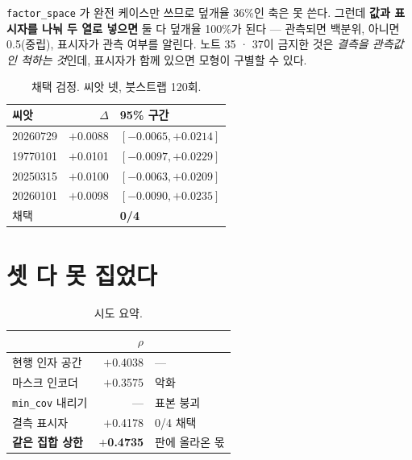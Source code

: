 \documentclass[10pt]{article}
\begin{document}
\texttt{factor\_space} 가 완전 케이스만 쓰므로 덮개율 36\%인 축은 못 쓴다.
그런데 \textbf{값과 표시자를 나눠 두 열로 넣으면} 둘 다 덮개율 100\%가 된다 ---
관측되면 백분위, 아니면 0.5(중립), 표시자가 관측 여부를 알린다. 노트 35 · 37이
금지한 것은 \emph{결측을 관측값인 척하는 것}인데, 표시자가 함께 있으면 모형이
구별할 수 있다.

\begin{table}[t]
\centering\tsize
\caption{채택 검정. 씨앗 넷, 붓스트랩 120회.}
\begin{tabular}{lrl}
\toprule
씨앗 & $\Delta$ & 95\% 구간 \\
\midrule
20260729 & $+$0.0088 & $[-0.0065, +0.0214]$ \\
19770101 & $+$0.0101 & $[-0.0097, +0.0229]$ \\
20250315 & $+$0.0100 & $[-0.0063, +0.0209]$ \\
20260101 & $+$0.0098 & $[-0.0090, +0.0235]$ \\
\midrule
\multicolumn{2}{l}{채택} & \textbf{0/4} \\
\bottomrule
\end{tabular}
\end{table}


\section{셋 다 못 집었다}

\begin{table}[t]
\centering\tsize
\caption{시도 요약.}
\begin{tabular}{lrl}
\toprule
& $\rho$ & \\
\midrule
현행 인자 공간 & $+$0.4038 & --- \\
마스크 인코더 & $+$0.3575 & 악화 \\
\texttt{min\_cov} 내리기 & --- & 표본 붕괴 \\
결측 표시자 & $+$0.4178 & 0/4 채택 \\
\midrule
\textbf{같은 집합 상한} & \textbf{$+$0.4735} & 판에 올라온 몫 \\
\bottomrule
\end{tabular}
\end{table}
\end{document}
